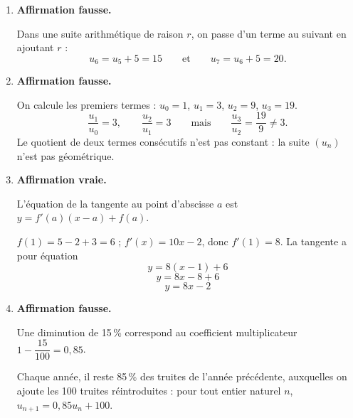 \begin{enumerate}
	\item \textbf{Affirmation fausse.}

	Dans une suite arithmétique de raison $r$, on passe d'un terme au suivant en
	ajoutant $r$ :
	\[u_6 = u_5 + 5 = 15 \qquad\text{et}\qquad u_7 = u_6 + 5 = 20.\]

	\item \textbf{Affirmation fausse.}

	On calcule les premiers termes : $u_0 = 1$, $u_1 = 3$, $u_2 = 9$, $u_3 = 19$.
	\[\dfrac{u_1}{u_0} = 3, \qquad \dfrac{u_2}{u_1} = 3 \qquad
	\text{mais} \qquad \dfrac{u_3}{u_2} = \dfrac{19}{9} \neq 3.\]
	Le quotient de deux termes consécutifs n'est pas constant : la suite $(u_n)$ n'est pas géométrique.

	\item \textbf{Affirmation vraie.}

	L'équation de la tangente au point d'abscisse $a$ est $y = f'(a)(x - a) + f(a)$.

	$f(1) = 5 - 2 + 3 = 6$ ; $f'(x) = 10x - 2$, donc $f'(1) = 8$. La tangente a pour équation
	\[y = 8(x - 1) + 6 \]
	\[ y = 8x - 8 + 6 \]
	\[ y = 8x - 2\]

	\item \textbf{Affirmation fausse.}

	Une diminution de 15\,\% correspond au coefficient multiplicateur
	$1 - \dfrac{15}{100} = 0,85$.

	Chaque année, il reste 85\,\% des truites de l'année précédente, auxquelles on ajoute les
	100 truites réintroduites : pour tout entier naturel $n$, $u_{n+1} = 0,85u_n + 100$.
\end{enumerate}
